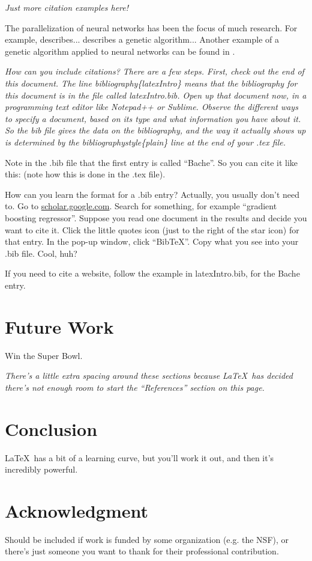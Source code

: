 \documentclass[twocolumn,letterpaper,10pt]{article}
\begin{document}
{\it Just more citation examples here!}

The parallelization of neural networks has been the focus of much research. For example, \cite{Kim} describes... \cite{Gruau} describes a genetic algorithm... Another example of a genetic algorithm applied to neural networks can be found in \cite{Soares}.

{\it How can you include citations? There are a few steps. First, check out the end of this document. The line bibliography\{latexIntro\} means that the bibliography for this document is in the file called latexIntro.bib. Open up that document now, in a programming text editor like Notepad++ or Sublime. Observe the different ways to specify a document, based on its type and what information you have about it. So the bib file gives the data on the bibliography, and the way it actually shows up is determined by the bibliographystyle\{plain\} line at the end of your .tex file. 

Note in the .bib file that the first entry is called ``Bache''. So you can cite it like this: \cite{Bache} (note how this is done in the .tex file).

How can you learn the format for a .bib entry? Actually, you usually don't need to. Go to \url{scholar.google.com}. Search for something, for example ``gradient boosting regressor''. Suppose you read one document in the results and decide you want to cite it. Click the little quotes icon (just to the right of the star icon) for that entry. In the pop-up window, click ``BibTeX''. Copy what you see into your .bib file. Cool, huh?

If you need to cite a website, follow the example in latexIntro.bib, for the Bache entry.}

\section{Future Work}

Win the Super Bowl.

{\it There's a little extra spacing around these sections because \LaTeX~has decided there's not enough room to start the ``References'' section on this page.}

\section{Conclusion}
\LaTeX~has a bit of a learning curve, but you'll work it out, and then it's incredibly powerful.

\section{Acknowledgment}
Should be included if work is funded by some organization (e.g. the NSF), or there's just someone you want to thank for their professional contribution.



\end{document}
